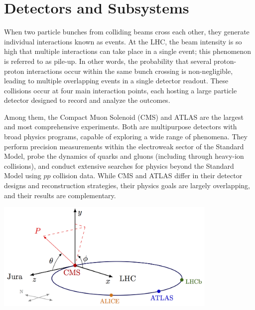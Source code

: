 \section{Detectors and Subsystems}\label{sec:detectors}

When two particle bunches from colliding beams cross each other, they generate individual interactions known as events. At the LHC, the beam intensity is so high that multiple interactions can take place in a single event; this phenomenon is referred to as pile-up. In other words, the probability that several proton-proton interactions occur within the same bunch crossing is non-negligible, leading to multiple overlapping events in a single detector readout. These collisions occur at four main interaction points, each hosting a large particle detector designed to record and analyze the outcomes. 

Among them, the Compact Muon Solenoid (CMS) and ATLAS are the largest and most comprehensive experiments. Both are multipurpose detectors with broad physics programs, capable of exploring a wide range of phenomena. They perform precision measurements within the electroweak sector of the Standard Model, probe the dynamics of quarks and gluons (including through heavy-ion collisions), and conduct extensive searches for physics beyond the Standard Model using $pp$ collision data. While CMS and ATLAS differ in their detector designs and reconstruction strategies, their physics goals are largely overlapping, and their results are complementary.

\begin{center}
    \includegraphics[width=0.8\textwidth]{Images/coordinatechart.png}
    \label{fig_coordinates}
\end{center}

